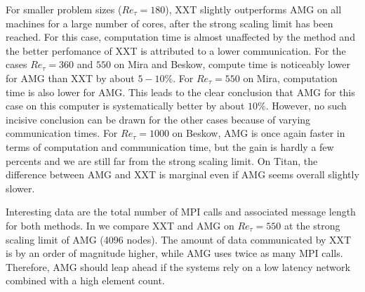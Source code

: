 \documentclass{sig-alternate}
\begin{document}
For smaller problem sizes ($Re_{\tau}=180$), XXT slightly outperforms AMG on all machines
for a large number of cores, after the strong scaling limit has been reached. 
For this case, computation time is almost unaffected by the method and the better perfomance
of XXT is attributed to a lower communication. For the cases $Re_{\tau}=360$ and 
$550$ on Mira and Beskow, compute time is noticeably lower for AMG than XXT by
about $5-10\%$. For $Re_{\tau}=550$ on Mira, computation time is also lower
for AMG. This leads to the clear conclusion that AMG for this case on this computer
is systematically better by about $10\%$. However, no such incisive conclusion can be drawn for the other
cases because of varying communication times. For $Re_{\tau}=1000$ on Beskow, 
AMG is once again faster in terms of computation and communication time, but the 
gain is hardly a few percents and we are still far from the strong scaling limit.
On Titan, the difference between AMG and XXT is marginal even if AMG seems overall
slightly slower.

Interesting data are the total number of MPI calls and associated message length
for both methods. In  we compare XXT and AMG on $Re_{\tau} = 550$ 
at the strong scaling limit of AMG (4096 nodes). The amount of data communicated 
by XXT is by an order of magnitude higher, while AMG uses twice as many MPI calls. 
Therefore, AMG should leap ahead if the systems rely on a low latency network 
combined with a high element count.
\end{document}
